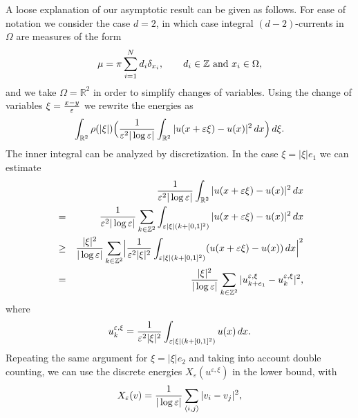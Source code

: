 \documentclass[11pt]{article}
\def\e{\varepsilon}
\def\dx{\,dx}
\begin{document}
\smallskip 

A loose explanation of our asymptotic result can be given as follows. For ease of notation we consider the case $d=2$, in which case integral $(d-2)$-currents in $\Omega$ are measures of the form 
\begin{equation}
\mu=\pi \sum_{i=1}^N d_i \delta_{x_i}, \qquad d_i\in \mathbb Z \hbox{ and } x_i\in\Omega,
\end{equation}
and we take $\Omega=\mathbb R^2$ in order to simplify changes of variables. Using the change of variables $\xi={x-y\over \e}$ we rewrite the energies as
\begin{equation}
\int_{\mathbb R^2}{\rho(|\xi|)} \Bigl({1\over\e^2|\log\e|}\int_{\mathbb R^2} |u(x+\e\xi)-u(x)|^2\dx\Bigr)\,d\xi.
\end{equation}
The inner integral can be analyzed by discretization. In the case $\xi=|\xi|e_1$ we can estimate
\begin{eqnarray*}
&& \hskip-3cm{1\over\e^2|\log\e|}\int_{\mathbb R^2} |u(x+\e\xi)-u(x)|^2\dx\\&=&{1\over\e^2|\log\e|}
\sum_{k\in\mathbb Z^2} 
\int_{\e |\xi|(k+ [0,1]^2)} |u(x+\e\xi)-u(x)|^2\dx\\
&\ge &{|\xi|^2\over|\log\e|}
\sum_{k\in\mathbb Z^2} \Bigl|{1\over\e^2|\xi|^2}
\int_{\e |\xi|(k+ [0,1]^2)} (u(x+\e\xi)-u(x))\dx\Bigr|^2\\
&=&{|\xi|^2\over|\log\e|}
\sum_{k\in\mathbb Z^2} | u^{\e,\xi}_{k+e_1}-u^{\e,\xi}_k|^2,
\end{eqnarray*}
where 
$$
u^{\e,\xi}_k= {1\over\e^2 |\xi|^2} \int_{\e |\xi|(k+ [0,1]^2)} u(x)\dx.
$$
Repeating the same argument for $\xi=|\xi|e_2$ and taking into account double counting, we can use the discrete energies $X_\e(u^{\e,\xi})$
in the lower bound, with
\begin{equation}\label{XY}
X_\e(v)={1\over |\log\e|}
\sum_{\langle i,j\rangle} |v_i-v_j|^2,
\end{equation}
\end{document}
